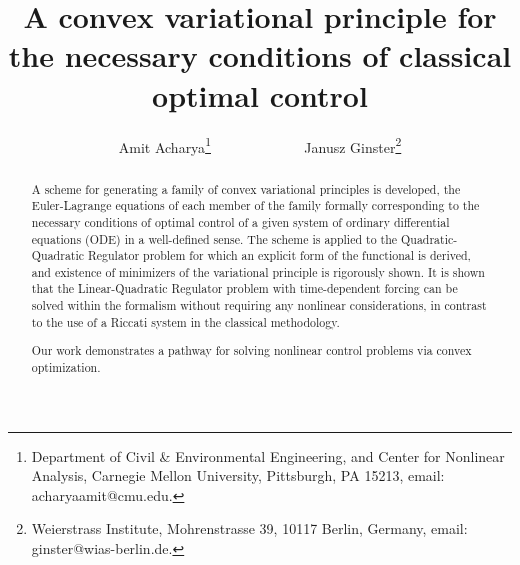 \documentclass[11pt]{article}
\date{}
\begin{document}
\title{A convex variational principle for the necessary conditions of classical optimal control}

\author{Amit Acharya\thanks{Department of Civil \& Environmental Engineering, and Center for Nonlinear Analysis, Carnegie Mellon University, Pittsburgh, PA 15213, email: acharyaamit@cmu.edu.} $\qquad \qquad \qquad$ Janusz Ginster\thanks{Weierstrass Institute, Mohrenstrasse 39, 10117 Berlin, Germany, email: ginster@wias-berlin.de.} }

\maketitle
\begin{abstract}
\noindent A scheme for generating a family of convex variational principles is developed, the Euler-Lagrange equations of each member of the family formally corresponding to the necessary conditions of optimal control of a given system of ordinary differential equations (ODE) in a well-defined sense. The scheme is applied to the Quadratic-Quadratic Regulator problem for which an explicit form of the functional is derived, and existence of minimizers of the variational principle is rigorously shown. It is shown that the Linear-Quadratic Regulator problem with time-dependent forcing can be solved within the formalism without requiring any nonlinear considerations, in contrast to the use of a Riccati system in the classical methodology.  

Our work demonstrates a pathway for solving nonlinear control problems via convex optimization.

\end{abstract}
\end{document}
